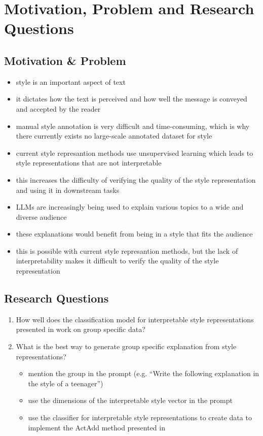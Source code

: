 
\section{Motivation, Problem and Research Questions}

\subsection{Motivation \& Problem}
\begin{itemize}
  \item style is an important aspect of text
  \item it dictates how the text is perceived and how well the message is conveyed and accepted by the reader
  \item manual style annotation is very difficult and time-consuming, which is why there currently exists no large-scale annotated dataset for style
  \item current style represantion methods use unsupervised learning which leads to style representations that are not interpretable
  \item this increases the difficulty of verifying the quality of the style representation and using it in downstream tasks
  \vspace{1em}
  \item LLMs are increasingly being used to explain various topics to a wide and diverse audience
  \item these explanations would benefit from being in a style that fits the audience
  \item this is possible with current style represantion methods, but the lack of interpretability makes it difficult to verify the quality of the style representation
\end{itemize}

\subsection{Research Questions}
\begin{enumerate}
  \item How well does the classification model for interpretable style representations presented in \citet{patelLearningInterpretableStyle2023} work on group specific data?
  \item What is the best way to generate group specific explanation from style representations?
  \begin{itemize}
    \item mention the group in the prompt (e.g. \enquote{Write the following explanation in the style of a teenager})
    \item use the dimensions of the interpretable style vector in the prompt
    \item use the classifier for interpretable style representations to create data to implement the ActAdd method presented in \citet{turnerActivationAdditionSteering2024}
  \end{itemize}
\end{enumerate}
